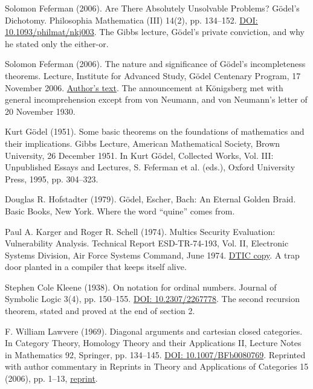 \documentclass[11pt,twoside]{article}
\theoremstyle{thielethm}
\theoremstyle{thieledef}
\theoremstyle{thieledef}
\theoremstyle{thieledef}
\theoremstyle{thielethm}
\theoremstyle{thieleobs}
\theoremstyle{thielethm}
\begin{document}
\noindent Solomon Feferman (2006). Are There Absolutely Unsolvable Problems? G\"odel's Dichotomy. Philosophia Mathematica (III) 14(2), pp. 134--152. \href{https://doi.org/10.1093/philmat/nkj003}{DOI: 10.1093/philmat/nkj003}. The Gibbs lecture, G\"odel's private conviction, and why he stated only the either-or.
\par\medskip

\noindent Solomon Feferman (2006). The nature and significance of G\"odel's incompleteness theorems. Lecture, Institute for Advanced Study, G\"odel Centenary Program, 17 November 2006. \href{https://math.stanford.edu/~feferman/papers/Godel-IAS.pdf}{Author's text}. The announcement at K\"onigsberg met with general incomprehension except from von Neumann, and von Neumann's letter of 20 November 1930.
\par\medskip

\noindent Kurt G\"odel (1951). Some basic theorems on the foundations of mathematics and their implications. Gibbs Lecture, American Mathematical Society, Brown University, 26 December 1951. In Kurt G\"odel, Collected Works, Vol. III: Unpublished Essays and Lectures, S. Feferman et al. (eds.), Oxford University Press, 1995, pp. 304--323.
\par\medskip

\noindent Douglas R. Hofstadter (1979). G\"odel, Escher, Bach: An Eternal Golden Braid. Basic Books, New York. Where the word ``quine'' comes from.
\par\medskip

\noindent Paul A. Karger and Roger R. Schell (1974). Multics Security Evaluation: Vulnerability Analysis. Technical Report ESD-TR-74-193, Vol. II, Electronic Systems Division, Air Force Systems Command, June 1974. \href{https://apps.dtic.mil/sti/pdfs/ADA001120.pdf}{DTIC copy}. A trap door planted in a compiler that keeps itself alive.
\par\medskip

\noindent Stephen Cole Kleene (1938). On notation for ordinal numbers. Journal of Symbolic Logic 3(4), pp. 150--155. \href{https://doi.org/10.2307/2267778}{DOI: 10.2307/2267778}. The second recursion theorem, stated and proved at the end of section 2.
\par\medskip

\noindent F. William Lawvere (1969). Diagonal arguments and cartesian closed categories. In Category Theory, Homology Theory and their Applications II, Lecture Notes in Mathematics 92, Springer, pp. 134--145. \href{https://doi.org/10.1007/BFb0080769}{DOI: 10.1007/BFb0080769}. Reprinted with author commentary in Reprints in Theory and Applications of Categories 15 (2006), pp. 1--13, \href{https://www.tac.mta.ca/tac/reprints/articles/15/tr15abs.html}{reprint}.
\par\medskip
\end{document}
